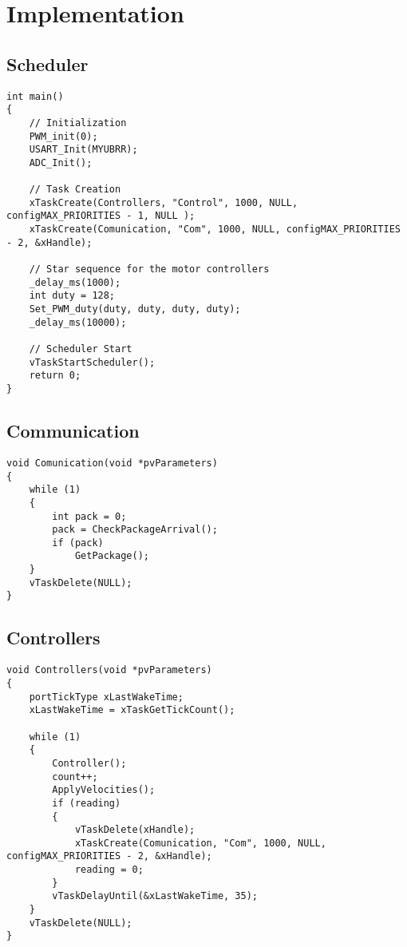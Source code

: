 \chapter{Implementation}




\section{Scheduler}
\begin{lstlisting}[style=customcpp,
                    caption={Code for initialization, creation of the different tasks, start sequence for the motors and call to the scheduler.}, 
                    label=lst:scheduler]
int main()
{
    // Initialization
    PWM_init(0);
    USART_Init(MYUBRR);
    ADC_Init();
    
    // Task Creation
    xTaskCreate(Controllers, "Control", 1000, NULL, configMAX_PRIORITIES - 1, NULL );
    xTaskCreate(Comunication, "Com", 1000, NULL, configMAX_PRIORITIES - 2, &xHandle);
    
    // Star sequence for the motor controllers
    _delay_ms(1000);
    int duty = 128;
    Set_PWM_duty(duty, duty, duty, duty);
    _delay_ms(10000);
 
    // Scheduler Start
    vTaskStartScheduler();
    return 0;
}                    
\end{lstlisting}


\section{Communication}
\begin{lstlisting}[style=customcpp,
                caption={Code for the comunication task.}, 
                label=lst:scheduler]
void Comunication(void *pvParameters)
{
    while (1)
    {
        int pack = 0;
        pack = CheckPackageArrival();
        if (pack)
            GetPackage();
    }
    vTaskDelete(NULL);
}
\end{lstlisting}


\section{Controllers}
\begin{lstlisting}[style=customcpp,
caption={Code for the controller task.}, 
label=lst:scheduler]
void Controllers(void *pvParameters)
{
    portTickType xLastWakeTime;
    xLastWakeTime = xTaskGetTickCount();
    
    while (1)
    {
        Controller();
        count++;
        ApplyVelocities();
        if (reading)
        {
            vTaskDelete(xHandle);
            xTaskCreate(Comunication, "Com", 1000, NULL, configMAX_PRIORITIES - 2, &xHandle);
            reading = 0;
        }
        vTaskDelayUntil(&xLastWakeTime, 35);
    }
    vTaskDelete(NULL);
}
\end{lstlisting}


